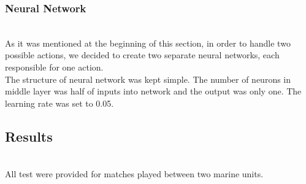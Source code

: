 \subsubsection{Neural Network}\hfill \\ \hphantom{x}
As it was mentioned at the beginning of this section, in order to handle two possible actions, we decided to create two separate neural networks, each responsible for one action.
\\ \hphantom{x}
The structure of neural network was kept simple. The number of neurons in middle layer was half of inputs into network and the output was only one. The learning rate was set to 0.05.


\subsection{Results}  \hfill \\ \hphantom{x}
All test were provided for matches played between two marine units.\\

